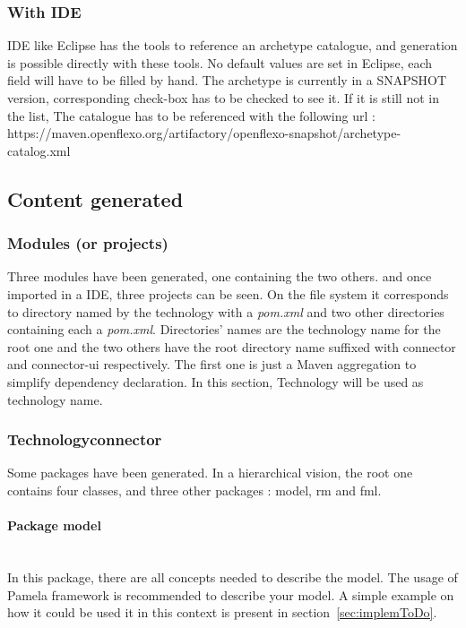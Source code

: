 \documentclass[9pt,a4paper]{article}
\begin{document}
		\subsubsection{With IDE}
		IDE like Eclipse has the tools to reference an archetype catalogue, and generation is possible directly with these tools. No default values are set in Eclipse, each field will have to be filled by hand. The archetype is currently in a SNAPSHOT version, corresponding check-box has to be checked to see it. If it is still not in the list, The catalogue has to be referenced with the following url : https://maven.openflexo.org/artifactory/openflexo-snapshot/archetype-catalog.xml %

	\subsection{Content generated}
		\subsubsection{Modules (or projects)}
		Three modules have been generated, one containing the two others. and once imported in a IDE, three projects can be seen. On the file system it corresponds to directory named by the technology with a \textit{pom.xml} and two other directories containing each a \textit{pom.xml}. Directories' names are the technology name for the root one and the two others have the root directory name suffixed with connector and connector-ui respectively. The first one is just a Maven aggregation to simplify dependency declaration. In this section, Technology will be used as technology name.
		
		\subsubsection{Technologyconnector}
		Some packages have been generated. In a hierarchical vision, the root one contains four classes, and three other packages : model, rm and fml.
		\paragraph{Package model}~\\
		In this package, there are all concepts needed to describe the model. The usage of Pamela framework is recommended to describe your model. A simple example on how it could  be used it in this context is present in section~\ref{sec:implemToDo}. 
\end{document}
